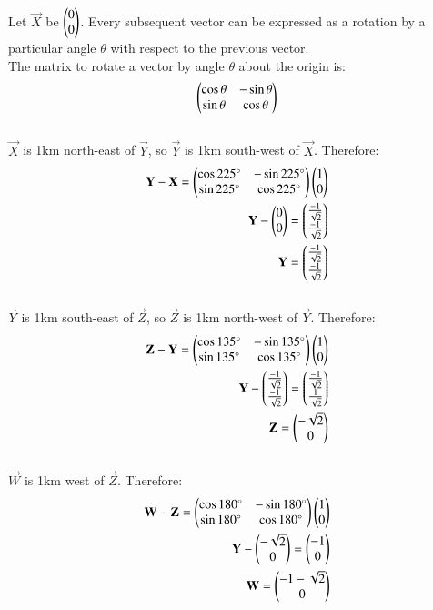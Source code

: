\documentclass[12pt]{article}
\begin{document}
Let $\vec{X}$ be $\begin{pmatrix}0\\0\end{pmatrix}$. Every subsequent vector can be expressed as a rotation by a particular angle $\theta$ with respect to the previous vector.\\
The matrix to rotate a vector by angle $\theta$ about the origin is:
\begin{align}
\begin{pmatrix}\cos\theta & -\sin\theta \\ \sin\theta & \cos\theta\end{pmatrix}
\end{align}\\
$\vec{X}$ is 1km north-east of $\vec{Y}$, so $\vec{Y}$ is 1km south-west of $\vec{X}$. Therefore:\begin{align}
\mathbf{Y}-\mathbf{X} = \begin{pmatrix}\cos225\degree & -\sin225\degree \\ \sin225\degree & \cos225\degree\end{pmatrix}\begin{pmatrix}1\\0\end{pmatrix}\\
\mathbf{Y}-\begin{pmatrix}0\\0\end{pmatrix} = \begin{pmatrix}\frac{-1}{\sqrt{2}}\\\frac{-1}{\sqrt{2}}\end{pmatrix}\\
\mathbf{Y}=\begin{pmatrix}\frac{-1}{\sqrt{2}}\\\frac{-1}{\sqrt{2}}\end{pmatrix}
\end{align}\\
$\vec{Y}$ is 1km south-east of $\vec{Z}$, so $\vec{Z}$ is 1km north-west of $\vec{Y}$. Therefore:\begin{align}
\mathbf{Z}-\mathbf{Y} = \begin{pmatrix}\cos135\degree & -\sin135\degree \\ \sin135\degree & \cos135\degree\end{pmatrix}\begin{pmatrix}1\\0\end{pmatrix}\\
\mathbf{Y}-\begin{pmatrix}\frac{-1}{\sqrt{2}}\\\frac{-1}{\sqrt{2}}\end{pmatrix} = \begin{pmatrix}\frac{-1}{\sqrt{2}}\\\frac{1}{\sqrt{2}}\end{pmatrix}\\
\mathbf{Z}=\begin{pmatrix}-\sqrt{2}\\0\end{pmatrix}
\end{align}\\
$\vec{W}$ is 1km west of $\vec{Z}$. Therefore:\begin{align}
\mathbf{W}-\mathbf{Z} = \begin{pmatrix}\cos180\degree & -\sin180\degree \\ \sin180\degree & \cos180\degree\end{pmatrix}\begin{pmatrix}1\\0\end{pmatrix}\\
\mathbf{Y}-\begin{pmatrix}-\sqrt{2}\\0\end{pmatrix} = \begin{pmatrix}-1\\0\end{pmatrix}\\
\mathbf{W}=\begin{pmatrix}-1-\sqrt{2}\\0\end{pmatrix}
\end{align}\\
\end{document}
